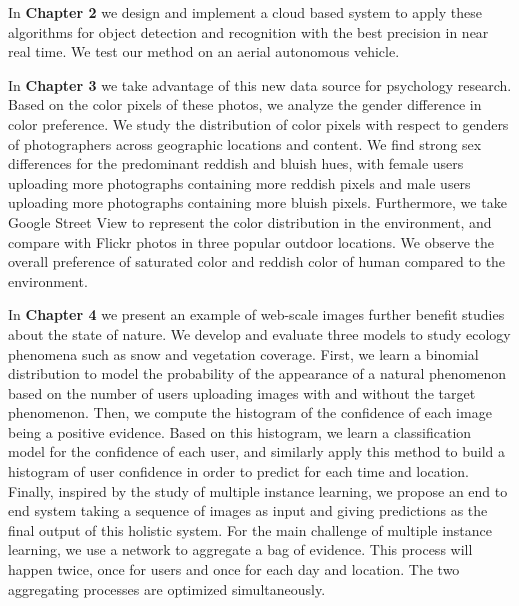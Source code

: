 \begin{compactitem}[--]
        \item In \textbf{Chapter 2} we design and implement a cloud based system to apply these algorithms for object detection and recognition with the best precision in near real time. We test our method on an aerial autonomous vehicle.
	\item In \textbf{Chapter 3} we take advantage of this new data source for psychology research. Based on the color pixels of these photos, we analyze the gender difference in color preference. We study the distribution of color pixels with respect to genders of photographers across geographic locations and content. We find strong sex differences for the predominant reddish and bluish hues, with female users uploading more photographs containing more reddish pixels and male users uploading more photographs containing more bluish pixels.  Furthermore, we take Google Street View to represent the color distribution in the environment, and compare with Flickr photos in three popular outdoor locations. We observe the overall preference of saturated color and reddish color of human compared to the environment.
	\item In \textbf{Chapter 4} we present an example of web-scale images further benefit studies about the state of nature. We develop and evaluate three models to study ecology phenomena such as snow and vegetation coverage.
First, we learn a binomial distribution to model the probability of the appearance of a natural phenomenon based on the number of users uploading images with and without the target phenomenon. 
Then, we compute the histogram of the confidence of each image being a positive evidence. Based on this histogram, we learn a classification model for the confidence of each user, and similarly apply this method to build a histogram of user confidence in order to predict for each time and location.
Finally, inspired by the study of multiple instance learning, we propose an end to end system taking a sequence of images as input and giving predictions as the final output of this holistic system. For the main challenge of multiple instance learning, we use a network to aggregate a bag of evidence. This process will happen twice, once for users and once for each day and location. The two aggregating processes are optimized simultaneously.
\end{compactitem}

